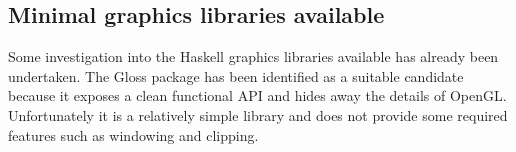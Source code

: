 \subsection{Minimal graphics libraries available}

Some investigation into the Haskell graphics libraries available has already been undertaken.
The Gloss package has been identified as a suitable candidate because it exposes a clean
functional API and hides away the details of OpenGL. Unfortunately it is a relatively simple
library and does not provide some required features such as windowing and clipping.
